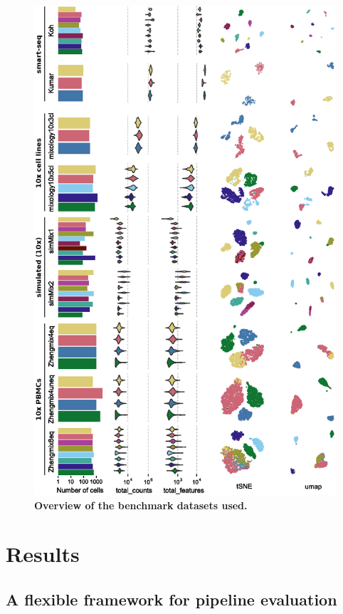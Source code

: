 \documentclass[11pt]{article}
\begin{document}
\begin{figure}
    \centering
    \includegraphics[width=\textwidth,keepaspectratio]{dataset_description}
    \caption{\textbf{Overview of the benchmark datasets used.}}
    \label{fig:figure1}
\end{figure}


\section*{Results}

\subsection*{A flexible framework for pipeline evaluation}
\end{document}
